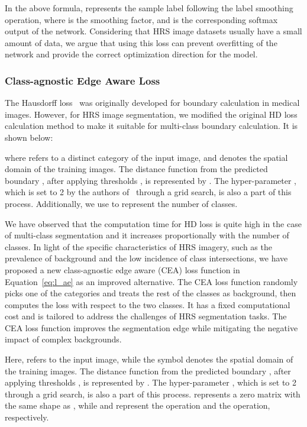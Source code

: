 \documentclass[journal]{IEEEtran}
\begin{document}
In the above formula,  represents the sample label following the label smoothing operation, where  is the smoothing factor, and  is the corresponding softmax output of the network. Considering that HRS image datasets usually have a small amount of data, we argue that using this loss can prevent overfitting of the network and provide the correct optimization direction for the model.

\subsubsection{Class-agnostic Edge Aware Loss}
The Hausdorff loss~\cite{karimi2019reducing} was originally developed for boundary calculation in medical images. However, for HRS image segmentation, we modified the original HD loss calculation method to make it suitable for multi-class boundary calculation. It is shown below:

where  refers to a distinct category of the input image, and  denotes the spatial domain of the training images. The distance function from the predicted boundary , after applying thresholds , is represented by . The hyper-parameter , which is set to 2 by the authors of~\cite{karimi2019reducing} through a grid search, is also a part of this process. Additionally, we use  to represent the number of classes.

We have observed that the computation time for HD loss is quite high in the case of multi-class segmentation and it increases proportionally with the number of classes. In light of the specific characteristics of HRS imagery, such as the prevalence of background and the low incidence of class intersections, we have proposed a new class-agnostic edge aware (CEA) loss function in Equation~\ref{eq:l_ae} as an improved alternative. The CEA loss function randomly picks one of the categories and treats the rest of the classes as background, then computes the loss with respect to the two classes. It has a fixed computational cost and is tailored to address the challenges of HRS segmentation tasks. The CEA loss function improves the segmentation edge while mitigating the negative impact of complex backgrounds.



Here,  refers to the input image, while the symbol  denotes the spatial domain of the training images. The distance function from the predicted boundary , after applying thresholds , is represented by . The hyper-parameter , which is set to 2 through a grid search, is also a part of this process.  represents a zero matrix with the same shape as , while  and  represent the  operation and the  operation, respectively.
\end{document}
